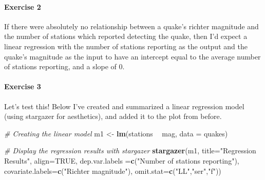 \documentclass[]{article}
\newenvironment{Shaded}{\begin{snugshade}}{\end{snugshade}}
\newcommand{\KeywordTok}[1]{\textcolor[rgb]{0.13,0.29,0.53}{\textbf{#1}}}
\newcommand{\DataTypeTok}[1]{\textcolor[rgb]{0.13,0.29,0.53}{#1}}
\newcommand{\StringTok}[1]{\textcolor[rgb]{0.31,0.60,0.02}{#1}}
\newcommand{\CommentTok}[1]{\textcolor[rgb]{0.56,0.35,0.01}{\textit{#1}}}
\newcommand{\OtherTok}[1]{\textcolor[rgb]{0.56,0.35,0.01}{#1}}
\newcommand{\OperatorTok}[1]{\textcolor[rgb]{0.81,0.36,0.00}{\textbf{#1}}}
\newcommand{\NormalTok}[1]{#1}
\let\oldparagraph\paragraph
\renewcommand{\paragraph}[1]{\oldparagraph{#1}\mbox{}}
\begin{document}
\paragraph{Exercise 2}\label{exercise-2}

If there were absolutely no relationship between a quake's richter
magnitude and the number of stations which reported detecting the quake,
then I'd expect a linear regression with the number of stations
reporting as the output and the quake's magnitude as the input to have
an intercept equal to the average number of stations reporting, and a
slope of 0.

\paragraph{Exercise 3}\label{exercise-3}

Let's test this! Below I've created and summarized a linear regression
model (using stargazer for aesthetics), and added it to the plot from
before.

\begin{Shaded}
\begin{Highlighting}[]
\CommentTok{# Creating the linear model}
\NormalTok{m1 <-}\StringTok{ }\KeywordTok{lm}\NormalTok{(stations }\OperatorTok{~}\StringTok{ }\NormalTok{mag, }\DataTypeTok{data =}\NormalTok{ quakes)}
\end{Highlighting}
\end{Shaded}

\begin{Shaded}
\begin{Highlighting}[]
\CommentTok{# Display the regression results with stargazer}
\KeywordTok{stargazer}\NormalTok{(m1, }\DataTypeTok{title=}\StringTok{"Regression Results"}\NormalTok{, }\DataTypeTok{align=}\OtherTok{TRUE}\NormalTok{, }
          \DataTypeTok{dep.var.labels =}\KeywordTok{c}\NormalTok{(}\StringTok{"Number of stations reporting"}\NormalTok{), }
          \DataTypeTok{covariate.labels=}\KeywordTok{c}\NormalTok{(}\StringTok{"Richter magnitude"}\NormalTok{),}
          \DataTypeTok{omit.stat=}\KeywordTok{c}\NormalTok{(}\StringTok{"LL"}\NormalTok{,}\StringTok{"ser"}\NormalTok{,}\StringTok{"f"}\NormalTok{))}
\end{Highlighting}
\end{Shaded}
\end{document}
